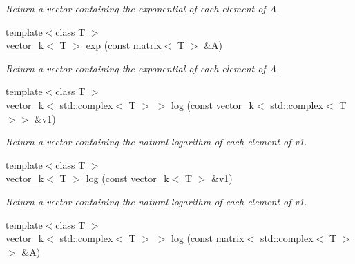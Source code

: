 \begin{DoxyCompactItemize}
\begin{DoxyCompactList}\small\item\em Return a vector containing the exponential of each element of A. \end{DoxyCompactList}\item 
\hypertarget{namespacekeycpp_ad67d2e26dfbe947035bcfdceda54f957}{{\footnotesize template$<$class T $>$ }\\\hyperlink{classkeycpp_1_1vector__k}{vector\-\_\-k}$<$ T $>$ \hyperlink{namespacekeycpp_ad67d2e26dfbe947035bcfdceda54f957}{exp} (const \hyperlink{classkeycpp_1_1matrix}{matrix}$<$ T $>$ \&A)}\label{namespacekeycpp_ad67d2e26dfbe947035bcfdceda54f957}

\begin{DoxyCompactList}\small\item\em Return a vector containing the exponential of each element of A. \end{DoxyCompactList}\item 
\hypertarget{namespacekeycpp_a3f3de1f36299e80f237c0e9669b9ee1d}{{\footnotesize template$<$class T $>$ }\\\hyperlink{classkeycpp_1_1vector__k}{vector\-\_\-k}$<$ std\-::complex$<$ T $>$ $>$ \hyperlink{namespacekeycpp_a3f3de1f36299e80f237c0e9669b9ee1d}{log} (const \hyperlink{classkeycpp_1_1vector__k}{vector\-\_\-k}$<$ std\-::complex$<$ T $>$$>$ \&v1)}\label{namespacekeycpp_a3f3de1f36299e80f237c0e9669b9ee1d}

\begin{DoxyCompactList}\small\item\em Return a vector containing the natural logarithm of each element of v1. \end{DoxyCompactList}\item 
\hypertarget{namespacekeycpp_a1b4681da0aec9ca45280970b47fd55d6}{{\footnotesize template$<$class T $>$ }\\\hyperlink{classkeycpp_1_1vector__k}{vector\-\_\-k}$<$ T $>$ \hyperlink{namespacekeycpp_a1b4681da0aec9ca45280970b47fd55d6}{log} (const \hyperlink{classkeycpp_1_1vector__k}{vector\-\_\-k}$<$ T $>$ \&v1)}\label{namespacekeycpp_a1b4681da0aec9ca45280970b47fd55d6}

\begin{DoxyCompactList}\small\item\em Return a vector containing the natural logarithm of each element of v1. \end{DoxyCompactList}\item 
\hypertarget{namespacekeycpp_a68ebe3cd64dbf2c0d09f33f5e7951317}{{\footnotesize template$<$class T $>$ }\\\hyperlink{classkeycpp_1_1vector__k}{vector\-\_\-k}$<$ std\-::complex$<$ T $>$ $>$ \hyperlink{namespacekeycpp_a68ebe3cd64dbf2c0d09f33f5e7951317}{log} (const \hyperlink{classkeycpp_1_1matrix}{matrix}$<$ std\-::complex$<$ T $>$$>$ \&A)}\label{namespacekeycpp_a68ebe3cd64dbf2c0d09f33f5e7951317}


\end{DoxyCompactItemize}
